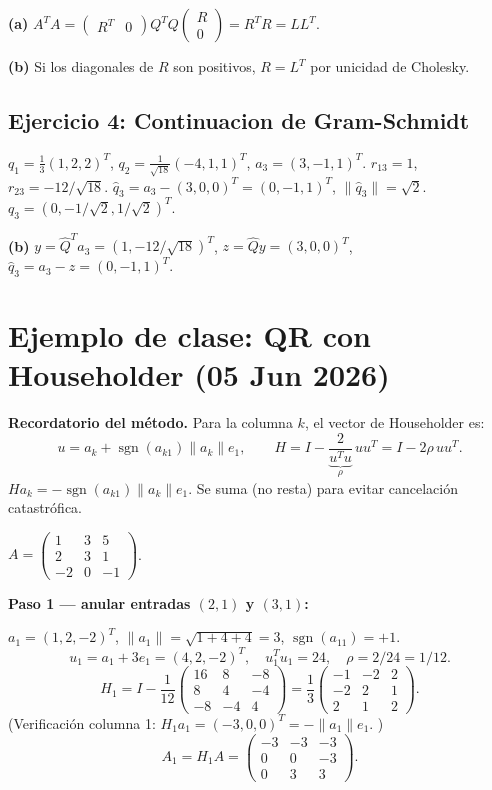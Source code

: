 \documentclass[11pt,a4paper]{article}
\begin{document}
\textbf{(a)} $A^TA = \begin{pmatrix}R^T&0\end{pmatrix}Q^TQ\begin{pmatrix}R\\0\end{pmatrix}=R^TR=LL^T$.

\textbf{(b)} Si los diagonales de $R$ son positivos, $R=L^T$ por unicidad de Cholesky.

\subsection{Ejercicio 4: Continuacion de Gram-Schmidt}

$q_1=\frac{1}{3}(1,2,2)^T$, $q_2=\frac{1}{\sqrt{18}}(-4,1,1)^T$, $a_3=(3,-1,1)^T$.
$r_{13}=1$, $r_{23}=-12/\sqrt{18}$.
$\hat{q}_3 = a_3-(3,0,0)^T = (0,-1,1)^T$, $\|{\hat{q}_3}\|=\sqrt{2}$.
$q_3 = (0,-1/\sqrt{2},1/\sqrt{2})^T$.

\textbf{(b)} $y=\hat{Q}^Ta_3=(1,-12/\sqrt{18})^T$, $z=\hat{Q}y=(3,0,0)^T$,
$\hat{q}_3=a_3-z=(0,-1,1)^T$. \checkmark

\section{Ejemplo de clase: QR con Householder (05 Jun 2026)}
\label{sec:householder_ejemplo}

\textbf{Recordatorio del método.} Para la columna $k$, el vector de Householder es:
\[
  u = a_k + \operatorname{sgn}(a_{k1})\|a_k\|e_1,
  \qquad H = I - \underbrace{\frac{2}{u^Tu}}_{\rho}\,uu^T = I - 2\rho\,uu^T.
\]
$Ha_k = -\operatorname{sgn}(a_{k1})\|a_k\|e_1$. Se suma (no resta) para evitar cancelación catastrófica.

$A = \begin{pmatrix}1&3&5\\2&3&1\\-2&0&-1\end{pmatrix}$.

\textbf{Paso 1 --- anular entradas $(2,1)$ y $(3,1)$:}

$a_1=(1,2,-2)^T$, $\|a_1\|=\sqrt{1+4+4}=3$, $\operatorname{sgn}(a_{11})=+1$.
\[
  u_1 = a_1 + 3e_1 = (4,2,-2)^T, \quad u_1^Tu_1=24, \quad \rho = 2/24 = 1/12.
\]
\[
  H_1 = I - \frac{1}{12}\begin{pmatrix}16&8&-8\\8&4&-4\\-8&-4&4\end{pmatrix}
      = \frac{1}{3}\begin{pmatrix}-1&-2&2\\-2&2&1\\2&1&2\end{pmatrix}.
\]
(Verificación columna 1: $H_1a_1 = (-3,0,0)^T = -\|a_1\|e_1$. \checkmark)
\[
  A_1 = H_1A = \begin{pmatrix}-3&-3&-3\\0&0&-3\\0&3&3\end{pmatrix}.
\]
\end{document}
